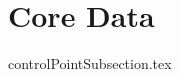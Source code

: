 \documentclass{book}
\title{}  %
\begin{document}
\ifstandalone
\maketitle %
\clearpage
\tableofcontents %
\clearpage
\fi

\section{Core Data}

{controlPointSubsection.tex}
\end{document}
